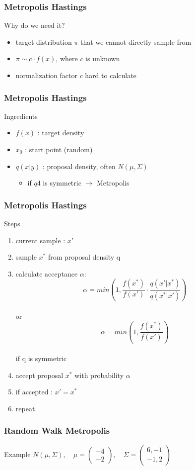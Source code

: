 \begin{frame}
\frametitle{Metropolis Hastings}

\begin{block}{Why do we need it?}
\begin{itemize}
\item target distribution $\pi$ that we cannot directly sample from
\item $\pi \sim c \cdot f(x)$, where $c$ is unknown
\item normalization factor $c$ hard to calculate
\end{itemize}
\end{block}

\end{frame}


\begin{frame}
\frametitle{Metropolis Hastings}


\begin{block}{Ingredients}
\begin{itemize}
\item $f(x)$ : target density
\item $x_0$ : start point (random)
\item $q(x|y)$ : proposal density, often $N(\mu, \Sigma)$ \\
\begin{itemize}
	\item if $q4$ is symmetric $\rightarrow$ Metropolis
\end{itemize}
\end{itemize}
\end{block}

\end{frame}

\begin{frame}
\frametitle{Metropolis Hastings}

\begin{block}{Steps}
\begin{enumerate}
  \item current sample : $x'$
\item sample $x^*$ from proposal density q
\item calculate acceptance $\alpha$:
\[\alpha = min\left(1, \frac{f(x^*)}{f(x')} \cdot
\frac{q(x'|x^*)}{q(x^*|x')} \right)\]\\
or\\
\[\alpha = min\left(1, \frac{f(x^*)}{f(x')}\right)\]\\ 
if q is symmetric

\item accept proposal $x^*$ with probability $\alpha$
\item if accepted : $x' = x^*$
\item repeat
\end{enumerate}
\end{block}
\end{frame}


\begin{frame}
\frametitle{Random Walk Metropolis}
\begin{block}{Example}
$N(\mu, \Sigma), \quad \mu = \begin{pmatrix} -4 \\ -2
\end{pmatrix} , \quad \Sigma = \begin{pmatrix} 6,-1 \\ -1,2
\end{pmatrix}$
\end{block}
\end{frame}